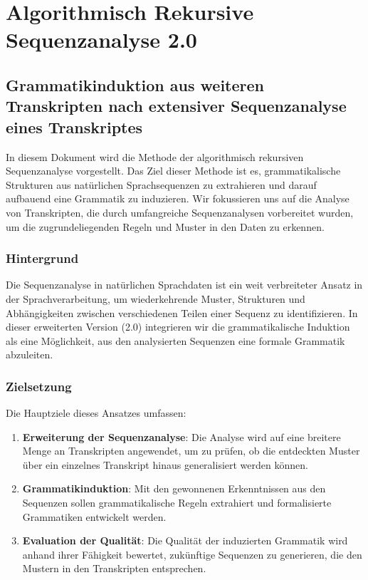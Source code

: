 \documentclass[
]{article}
\author{}
\date{}
\begin{document}
\section{Algorithmisch Rekursive Sequenzanalyse
2.0}\label{algorithmisch-rekursive-sequenzanalyse-2.0}

\subsection{Grammatikinduktion aus weiteren Transkripten nach extensiver
Sequenzanalyse eines
Transkriptes}\label{grammatikinduktion-aus-weiteren-transkripten-nach-extensiver-sequenzanalyse-eines-transkriptes}

In diesem Dokument wird die Methode der algorithmisch rekursiven
Sequenzanalyse vorgestellt. Das Ziel dieser Methode ist es,
grammatikalische Strukturen aus natürlichen Sprachsequenzen zu
extrahieren und darauf aufbauend eine Grammatik zu induzieren. Wir
fokussieren uns auf die Analyse von Transkripten, die durch umfangreiche
Sequenzanalysen vorbereitet wurden, um die zugrundeliegenden Regeln und
Muster in den Daten zu erkennen.

\subsubsection{Hintergrund}\label{hintergrund}

Die Sequenzanalyse in natürlichen Sprachdaten ist ein weit verbreiteter
Ansatz in der Sprachverarbeitung, um wiederkehrende Muster, Strukturen
und Abhängigkeiten zwischen verschiedenen Teilen einer Sequenz zu
identifizieren. In dieser erweiterten Version (2.0) integrieren wir die
grammatikalische Induktion als eine Möglichkeit, aus den analysierten
Sequenzen eine formale Grammatik abzuleiten.

\subsubsection{Zielsetzung}\label{zielsetzung}

Die Hauptziele dieses Ansatzes umfassen:

\begin{enumerate}
\def\labelenumi{\arabic{enumi}.}
\item
  \textbf{Erweiterung der Sequenzanalyse}: Die Analyse wird auf eine
  breitere Menge an Transkripten angewendet, um zu prüfen, ob die
  entdeckten Muster über ein einzelnes Transkript hinaus generalisiert
  werden können.
\item
  \textbf{Grammatikinduktion}: Mit den gewonnenen Erkenntnissen aus den
  Sequenzen sollen grammatikalische Regeln extrahiert und formalisierte
  Grammatiken entwickelt werden.
\item
  \textbf{Evaluation der Qualität}: Die Qualität der induzierten
  Grammatik wird anhand ihrer Fähigkeit bewertet, zukünftige Sequenzen
  zu generieren, die den Mustern in den Transkripten entsprechen.
\end{enumerate}
\end{document}
